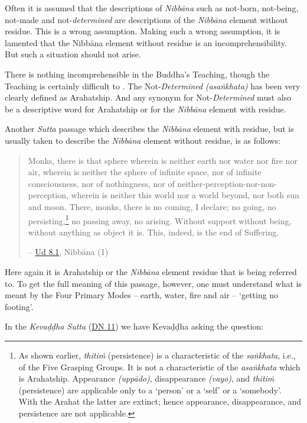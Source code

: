 Often it is assumed that the descriptions of \emph{Nibbāna} such as not-born, not-being, not-made and not-\emph{determined} are descriptions of the \emph{Nibbāna} element without residue. This is a wrong assumption. Making such a wrong assumption, it is lamented that the Nibbāna element without residue is an incomprehensibility. But such a situation should not arise.

There is nothing incomprehensible in the Buddha's Teaching, though the Teaching is certainly difficult to . The Not-\emph{Determined} \emph{(asaṅkhata)} has been very clearly defined as Arahatship. And any synonym for Not-\emph{Determined} must also be a descriptive word for Arahatship or for the \emph{Nibbāna} element with residue.

Another \emph{Sutta} passage which describes the \emph{Nibbāna} element with residue, but is usually taken to describe the \emph{Nibbāna} element without residue, is as follows:

\begin{quote}
Monks, there is that sphere wherein is neither earth nor water nor fire nor air, wherein is neither the sphere of infinite space, nor of infinite consciousness, nor of nothingness, nor of neither-perception-nor-non-perception, wherein is neither this world nor a world beyond, nor both sun and moon. There, monks, there is no coming, I declare; no going, no persisting,\footnote{As shown earlier, \emph{thitiṁ} (persistence) is a characteristic of the \emph{saṅkhata}, i.e., of the Five Grasping Groups. It is not a characteristic of the \emph{asaṅkhata} which is Arahatship. Appearance \emph{(uppādo)}, disappearance \emph{(vayo)}, and \emph{thitiṁ} (persistence) are applicable only to a `person' or a `self' or a `somebody'. With the Arahat the latter are extinct; hence appearance, disappearance, and persistence are not applicable.} no passing away, no arising. Without support without being, without anything as object it is. This, indeed, is the end of Suffering.

 -- \href{https://suttacentral.net/ud8.1/en/anandajoti}{Ud 8.1}, Nibbāna (1)
\end{quote}

Here again it is Arahatship or the \emph{Nibbāna} element  residue that is being referred to. To get the full meaning of this passage, however, one must understand what is meant by the Four Primary Modes -- earth, water, fire and air -- `getting no footing'.

In the \emph{Kevaḍḍha Sutta} (\href{https://suttacentral.net/dn11/en/sujato}{DN 11}) we have Kevaḍḍha asking the question:

